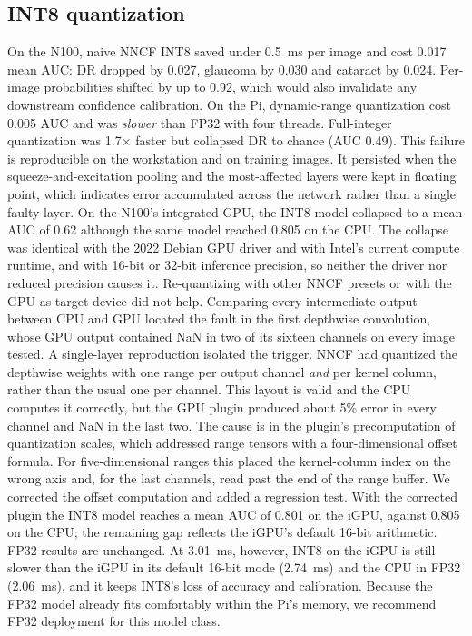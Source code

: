 \documentclass[a4paper,fleqn]{cas-sc}
\begin{document}
\subsection{INT8 quantization}
\label{sec:int8}
On the N100, naive NNCF INT8 saved under 0.5~ms per image and cost 0.017
mean AUC: DR dropped by 0.027, glaucoma by 0.030 and cataract by 0.024.
Per-image probabilities shifted by up to 0.92, which would also invalidate
any downstream confidence calibration. On the Pi, dynamic-range
quantization cost 0.005 AUC and was \emph{slower} than FP32 with four
threads. Full-integer quantization was 1.7$\times$ faster but collapsed DR
to chance (AUC 0.49). This failure is reproducible on the workstation and
on training images. It persisted when the squeeze-and-excitation pooling
and the most-affected layers were kept in floating point, which indicates
error accumulated across the network rather than a single faulty layer.
On the N100's integrated GPU, the INT8 model collapsed to a mean AUC of
0.62 although the same model reached 0.805 on the CPU. The collapse was
identical with the 2022 Debian GPU driver and with Intel's current
compute runtime, and with 16-bit or 32-bit inference precision, so
neither the driver nor reduced precision causes it. Re-quantizing with
other NNCF presets or with the GPU as target device did not help.
Comparing every intermediate output between CPU and GPU located the fault
in the first depthwise convolution, whose GPU output contained NaN in two
of its sixteen channels on every image tested. A single-layer reproduction
isolated the trigger. NNCF had quantized the depthwise weights with one
range per output channel \emph{and} per kernel column, rather than the
usual one per channel. This layout is valid and the CPU computes it
correctly, but the GPU plugin produced about 5\% error in every channel
and NaN in the last two. The cause is in the plugin's precomputation of
quantization scales, which addressed range tensors with a
four-dimensional offset formula. For five-dimensional ranges this placed
the kernel-column index on the wrong axis and, for the last channels,
read past the end of the range buffer. We corrected the offset
computation and added a regression test. With the corrected plugin the
INT8 model reaches a mean AUC of 0.801 on the iGPU, against 0.805 on the
CPU; the remaining gap reflects the iGPU's default 16-bit arithmetic.
FP32 results are unchanged. At 3.01~ms, however, INT8 on the iGPU is
still slower than the iGPU in its default 16-bit mode (2.74~ms) and the
CPU in FP32 (2.06~ms), and it keeps INT8's loss of accuracy and
calibration. Because the FP32 model already fits
comfortably within the Pi's memory, we recommend FP32 deployment for this
model class.
\end{document}
